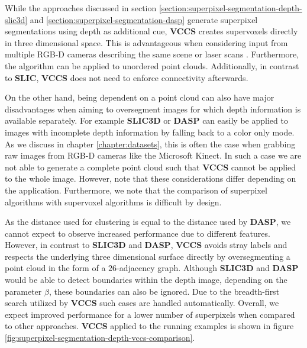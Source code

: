 While the approaches discussed in section \ref{section:superpixel-segmentation-depth-slic3d} and \ref{section:superpixel-segmentation-dasp} generate superpixel segmentations using depth as additional cue, \textbf{VCCS} creates supervoxels directly in three dimensional space. This is advantageous when considering input from multiple RGB-D cameras describing the same scene or laser scans \cite{PaponAbramovSchoelerWoergoetter:2013}. Furthermore, the algorithm can be applied to unordered point clouds. Additionally, in contrast to \textbf{SLIC}, \textbf{VCCS} does not need to enforce connectivity afterwards.

On the other hand, being dependent on a point cloud can also have major disadvantages when aiming to oversegment images for which depth information is available separately. For example \textbf{SLIC3D} or \textbf{DASP} can easily be applied to images with incomplete depth information by falling back to a color only mode. As we discuss in chapter \ref{chapter:datasets}, this is often the case when grabbing raw images from RGB-D cameras like the Microsoft Kinect. In such a case we are not able to generate a complete point cloud such that \textbf{VCCS} cannot be applied to the whole image. However, note that these considerations differ depending on the application. Furthermore, we note that the comparison of superpixel algorithms with supervoxel algorithms is difficult by design.

As the distance used for clustering is equal to the distance used by \textbf{DASP}, we cannot expect to observe increased performance due to different features. However, in contrast to \textbf{SLIC3D} and \textbf{DASP}, \textbf{VCCS} avoids stray labels and respects the underlying three dimensional surface directly by oversegmenting a point cloud in the form of a $26$-adjacency graph. Although \textbf{SLIC3D} and \textbf{DASP} would be able to detect boundaries within the depth image, depending on the parameter $\beta$, these boundaries can also be ignored. Due to the breadth-first search utilized by \textbf{VCCS} such cases are handled automatically. Overall, we expect improved performance for a lower number of superpixels when compared to other approaches. \textbf{VCCS} applied to the running examples is shown in figure \ref{fig:superpixel-segmentation-depth-vccs-comparison}.


